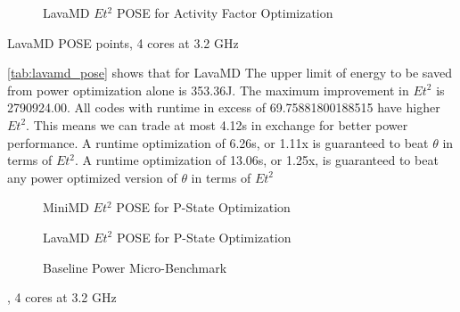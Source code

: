 \begin{figure}
\centering

\caption{LavaMD $Et^2$ POSE for Activity Factor Optimization}
\label{fig:lavamd}
\end{figure}

\begin{table}
\centering

\caption{LavaMD POSE points, 4 cores at 3.2 GHz}
\label{tab:lavamd_pose}
\end{table} 


\autoref{tab:lavamd_pose} shows that for LavaMD The upper limit of energy to be saved from power optimization alone is 353.36J.
The maximum improvement in $Et^2$ is 2790924.00.
All codes with runtime in excess of 69.75881800188515 have higher $Et^2$.
This means we can trade at most 4.12s in exchange for better power performance.
A runtime optimization of 6.26s, or 1.11x is guaranteed to beat $\theta$ in terms of $Et^2$. 
A runtime optimization of 13.06s, or 1.25x, is guaranteed to beat any power optimized version of $\theta$ in terms of $Et^2$ 


\begin{figure}
\centering

\caption{MiniMD $Et^2$ POSE for P-State Optimization}
\label{fig:minimd-pstates}
\end{figure}



\begin{figure}
\centering

\caption{LavaMD $Et^2$ POSE for P-State Optimization}
\label{fig:lavamd-pstates}
\end{figure}


\begin{figure}[ht]                                                               
\centering                                                                      
\lstset{basicstyle=\ttfamily\footnotesize\bfseries, frame=tb} %
              
\caption{Baseline Power Micro-Benchmark}                            
\label{fig:microbench}                                                           
\end{figure}  



\begin{table}
\centering

\caption{, 4 cores at 3.2 GHz}
\end{table} 



